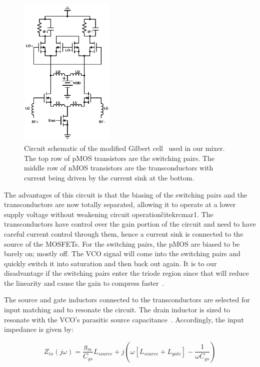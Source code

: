 \begin{figure}[h]
   \centering
    \includegraphics[width=0.40\textwidth]{figures/Mixer.pdf}
    \caption{
        Circuit schematic of the modified Gilbert cell~\cite{krcmar1} used in our mixer. The top row of pMOS transistors are the switching pairs. The middle row of nMOS transistors are the transconductors with current being driven by the current sink at the bottom.
    }
    \label{fig:mixer}
\end{figure}

The advantages of this circuit is that the biasing of the switching pairs and the transconductors are now totally separated, allowing it to operate at a lower supply voltage without weakening circuit operation\~cite{krcmar1}. The transconductors have control over the gain portion of the circuit and need to have careful current control through them, hence a current sink is connected to the source of the MOSFETs. For the switching pairs, the pMOS are biased to be barely on; mostly off.  The VCO signal will come into the switching pairs and quickly switch it into saturation and then back out again. It is to our disadvantage if the switching pairs enter the triode region since that will reduce the linearity and cause the gain to compress faster~\cite{Razavi}. 

The source and gate inductors connected to the transconductors are selected for input matching and to resonate the circuit. The drain inductor is sized to resonate with the VCO's parasitic source capacitance~\cite{krcmar1}. Accordingly, the input impedance is given by:

\begin{equation} 
  	Z_{in}(j\omega) = \frac{g_{m}}{C_{gs}}L_{source}+j(\omega[L_{source}+L_{gate}]-\frac{1}{\omega C_{gs}})
	\label{eq:mixerZin}
\end{equation}

